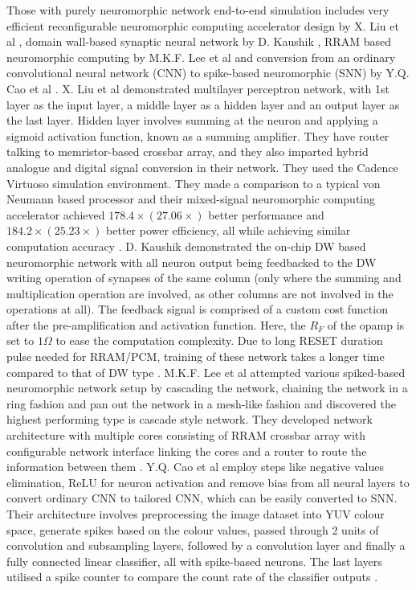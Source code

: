 Those with purely neuromorphic network end-to-end simulation includes very efficient reconfigurable neuromorphic computing accelerator design by X. Liu et al \cite{liu}, domain wall-based synaptic neural network by D. Kaushik \cite{kaushik}, RRAM based neuromorphic computing by M.K.F. Lee et al \cite{lee} and conversion from an ordinary convolutional neural network (CNN) to spike-based neuromorphic (SNN) by Y.Q. Cao et al \cite{cao}. X. Liu et al demonstrated multilayer perceptron network, with 1st layer as the input layer, a middle layer as a hidden layer and an output layer as the last layer. Hidden layer involves summing at the neuron and applying a sigmoid activation function, known as a summing amplifier. They have router talking to memristor-based crossbar array, and they also imparted hybrid analogue and digital signal conversion in their network. They used the Cadence Virtuoso simulation environment. They made a comparison to a typical von Neumann based processor and their mixed-signal neuromorphic computing accelerator achieved $178.4\times (27.06\times)$ better performance and $184.2\times (25.23\times)$ better power efficiency, all while achieving similar computation accuracy \cite{liu}. D. Kaushik demonstrated the on-chip DW based neuromorphic network with all neuron output being feedbacked to the DW writing operation of synapses of the same column (only where the summing and multiplication operation are involved, as other columns are not involved in the operations at all). The feedback signal is comprised of a custom cost function after the pre-amplification and activation function. Here, the $R_F$ of the opamp is set to $1\Omega$ to ease the computation complexity. Due to long RESET duration pulse needed for RRAM/PCM, training of these network takes a longer time compared to that of DW type \cite{kaushik}. M.K.F. Lee et al attempted various spiked-based neuromorphic network setup by cascading the network, chaining the network in a ring fashion and pan out the network in a mesh-like fashion and discovered the highest performing type is cascade style network. They developed network architecture with multiple cores consisting of RRAM crossbar array with configurable network interface linking the cores and a router to route the information between them \cite{lee}. Y.Q. Cao et al employ steps like negative values elimination, ReLU for neuron activation and remove bias from all neural layers to convert ordinary CNN to tailored CNN, which can be easily converted to SNN. Their architecture involves preprocessing the image dataset into YUV colour space, generate spikes based on the colour values, passed through 2 units of convolution and subsampling layers, followed by a convolution layer and finally a fully connected linear classifier, all with spike-based neurons. The last layers utilised a spike counter to compare the count rate of the classifier outputs \cite{cao}.

